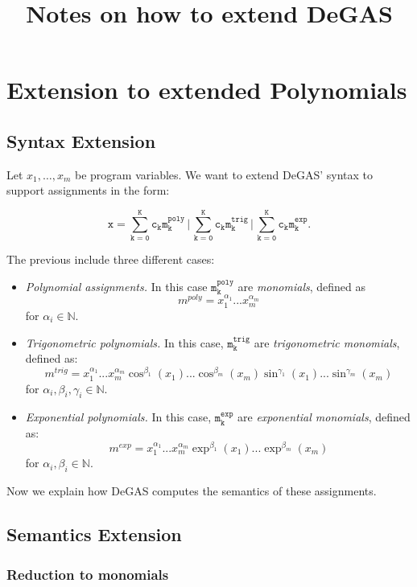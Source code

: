 \documentclass{article}
\title{Notes on how to extend DeGAS}
\author{}
\date{}
\begin{document}
\section{Extension to extended Polynomials}

\subsection{Syntax Extension}

Let $x_1, \hdots, x_m$ be program variables.
We want to extend DeGAS' syntax to support assignments in the form:

$$ \mathtt{ x = \sum_{k=0}^K c_k m^{poly}_k \, \Bigg| \, \sum_{k=0}^K c_k m^{trig}_k \, \Bigg| \, \sum_{k=0}^K c_k m^{exp}_k}.$$

The previous include three different cases:
\begin{itemize}
    
    \item[i)] \textit{Polynomial assignments.} In this case $\mathtt{m^{poly}_k}$ are \textit{monomials}, defined as 
    $$ m^{poly} = x_1^{\alpha_1}...x_m^{\alpha_m}$$
    for $\alpha_i \in \mathbb{N}$.

    \item[ii)] \textit{Trigonometric polynomials.} In this case, $\mathtt{m^{trig}_k}$ are \textit{trigonometric monomials}, defined as:
    $$ m^{trig} = x_1^{\alpha_1}...x_{m}^{\alpha_m} \cos^{\beta_1}(x_1)...\cos^{\beta_m}(x_m)\sin^{\gamma_1}(x_1)...\sin^{\gamma_m}(x_m)$$
    for $\alpha_i, \beta_i, \gamma_i \in \mathbb{N}$.

    \item[iii)] \textit{Exponential polynomials.} In this case, $\mathtt{m^{exp}_k}$ are \textit{exponential monomials}, defined as:
    $$ m^{exp} = x_1^{\alpha_1}...x_m^{\alpha_m}\exp^{\beta_1}(x_1)...\exp^{\beta_m}(x_m)$$
    for $\alpha_i, \beta_i \in \mathbb{N}$.
   
\end{itemize}

Now we explain how DeGAS computes the semantics of these assignments.

\subsection{Semantics Extension}

\subsubsection{Reduction to monomials}
\end{document}
